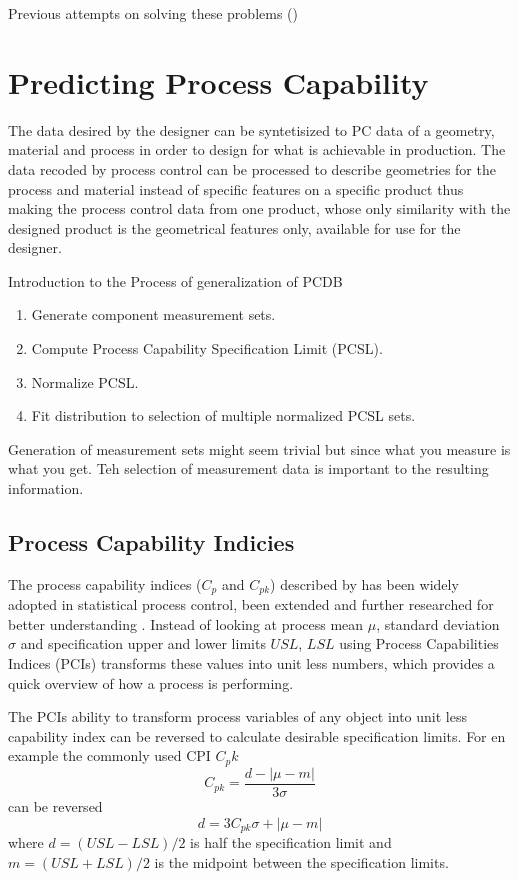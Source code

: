 \documentclass[aip,amsmath, reprint, author-year]{revtex4-1}
\begin{document}
Previous attempts on solving these problems 
(\cite{kern2003forecasting, thornton2004variation})

\section{Predicting Process Capability}

The data desired by the designer can be syntetisized to PC data of a geometry, material and process in order to design for what is achievable in production. 
The data recoded by process control can be processed to describe geometries for the process and material instead of specific features on a specific product thus making the process control data from one product, whose only similarity with the designed product is the geometrical features only, available for use for the designer.

Introduction to the Process of generalization of PCDB

\begin{enumerate}
 	\item Generate component measurement sets. 
	\item Compute Process Capability Specification Limit (PCSL).
	\item Normalize PCSL.
	\item Fit distribution to selection of multiple normalized PCSL sets.
\end{enumerate}

	Generation of measurement sets might seem trivial but since what you measure is what you get. Teh selection of measurement data is important to the resulting information.

\subsection{Process Capability Indicies}
The process capability indices ($C_p$ and $C_{pk}$) described by \cite{kane1986process} has been widely adopted in statistical process control, been extended and further researched for better understanding \citep{wu2009overview}. 
Instead of looking at process mean $\mu$, standard deviation $\sigma$ and specification upper and lower limits $USL$, $LSL$ using Process Capabilities Indices (PCIs) transforms these values into unit less numbers, which provides a quick overview of how a process is performing.

The PCIs ability to transform process variables of any object into unit less capability index can be reversed to calculate desirable specification limits. For en example the commonly used CPI $C_pk$ 
\begin{equation}
	C_{pk} = \frac{d - | \mu - m|}{3 \sigma}
\end{equation}
can be reversed
\begin{equation}
	d = 3 C_{pk} \sigma + | \mu - m|
\end{equation}
where $d = (USL - LSL) / 2$ is half the specification limit and $m = (USL + LSL) / 2$ is the midpoint between the specification limits. 
\end{document}

